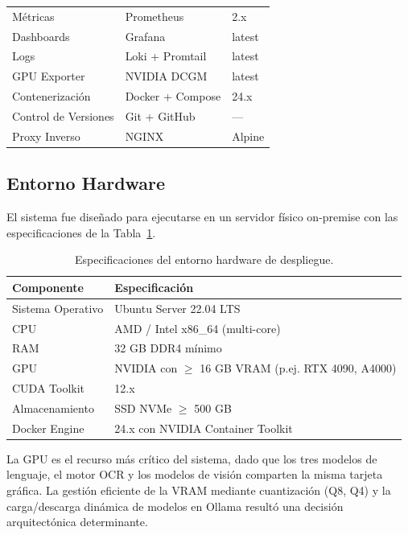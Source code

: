 \begin{table}[H]
\begin{tabular}{lll}
\midrule
Métricas            & Prometheus   & 2.x \\
Dashboards          & Grafana      & latest \\
Logs                & Loki + Promtail & latest \\
GPU Exporter        & NVIDIA DCGM  & latest \\
\midrule
Contenerización     & Docker + Compose & 24.x \\
Control de Versiones& Git + GitHub & --- \\
Proxy Inverso       & NGINX        & Alpine \\
\bottomrule
\end{tabular}
\end{table}

\subsection{Entorno Hardware}

El sistema fue diseñado para ejecutarse en un servidor físico on-premise con las especificaciones de la Tabla~\ref{tab:hardware}.

\begin{table}[H]
\centering
\caption{Especificaciones del entorno hardware de despliegue.}
\label{tab:hardware}
\begin{tabular}{ll}
\toprule
\textbf{Componente} & \textbf{Especificación} \\
\midrule
Sistema Operativo  & Ubuntu Server 22.04 LTS \\
CPU                & AMD / Intel x86\_64 (multi-core) \\
RAM                & 32 GB DDR4 mínimo \\
GPU                & NVIDIA con $\geq$ 16 GB VRAM (p.ej. RTX 4090, A4000) \\
CUDA Toolkit       & 12.x \\
Almacenamiento     & SSD NVMe $\geq$ 500 GB \\
Docker Engine      & 24.x con NVIDIA Container Toolkit \\
\bottomrule
\end{tabular}
\end{table}

La GPU es el recurso más crítico del sistema, dado que los tres modelos de lenguaje, el motor OCR y los modelos de visión comparten la misma tarjeta gráfica. La gestión eficiente de la VRAM mediante cuantización (Q8, Q4) y la carga/descarga dinámica de modelos en Ollama resultó una decisión arquitectónica determinante.

